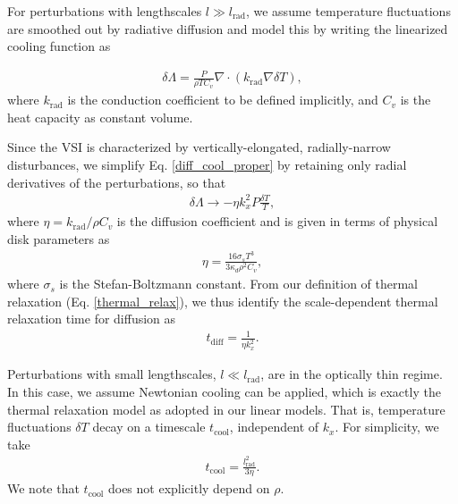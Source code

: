 For perturbations with lengthscales $l\gg l_\mathrm{rad}$, we assume
temperature fluctuations are smoothed out by radiative diffusion and
model this by writing the linearized cooling function as 

\begin{align}\label{diff_cool_proper}
  \delta \Lambda = \frac{P}{\rho T C_v} \nabla\cdot\left(k_\mathrm{rad}\nabla\delta
    T\right),  
\end{align}
where $k_\mathrm{rad}$ is the conduction coefficient to be defined
implicitly, and $C_v$ is the heat capacity as constant volume. 


Since the VSI is characterized by vertically-elongated,
radially-narrow disturbances, we simplify Eq. \ref{diff_cool_proper} 
by retaining only radial derivatives of the perturbations, so that 
\begin{align}\label{diff_cool_approx}
  \delta\Lambda \to %
  -\eta k_x^2 P \frac{\delta T}{T}, %
\end{align}
 where $\eta=k_\mathrm{rad}/\rho C_v$ is
the diffusion coefficient and 
is given in terms of physical disk parameters as 
\begin{align}\label{eta_def}
  \eta = \frac{16\sigma_s T^3}{3\kappa_d\rho^2 C_v}, 
\end{align}
where $\sigma_s$ is the Stefan-Boltzmann constant. From our
definition of thermal relaxation (Eq. \ref{thermal_relax}), 
we thus identify the scale-dependent thermal relaxation
time for diffusion as 
\begin{align}\label{tc_diff_cool} 
  t_\mathrm{diff} = \frac{1}{\eta k_x^2}.%
\end{align}

Perturbations with small lengthscales, $l\ll 
l_\mathrm{rad}$, are in the optically thin regime. In this case, we assume 
Newtonian cooling can be applied, which is exactly the thermal 
relaxation model as adopted in our linear models. That is, temperature
fluctuations $\delta T$ decay on a timescale $t_\mathrm{cool}$,
independent of $k_x$. For simplicity, we take  
\begin{align}
  t_\mathrm{cool} = \frac{l_\mathrm{rad}^2}{3\eta}. 
\end{align}
We note that $t_\mathrm{cool}$ does not explicitly depend on $\rho$. 

